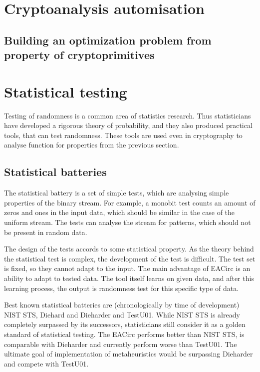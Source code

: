 \documentclass[
  print, %
  Table,   %
  nolof,     %
  nolot,     %
  11pt, %
  oneside  %
]{fithesis3}
\begin{document}
\section{Cryptoanalysis automisation}
\label{sec:cryptoanalysis-automisation}



\subsection[Optimization problem for a cryptoprimitive]{Building an optimization problem from property of cryptoprimitives}
\label{subsec:opti-crypto}


\section{Statistical testing}
\label{sec:stat-testing}

Testing of randomness is a common area of statistics research. Thus statisticians have developed a rigorous theory of probability, and they also produced practical tools, that can test randomness. These tools are used even in cryptography to analyse function for properties from the previous section.

\subsection{Statistical batteries}
\label{subsec:stat-batt}

The statistical battery is a set of simple tests, which are analysing simple properties of the binary stream. For example, a monobit test counts an amount of zeros and ones in the input data, which should be similar in the case of the uniform stream. The tests can analyse the stream for patterns, which should not be present in random data.

The design of the tests accords to some statistical property. As the theory behind the statistical test is complex, the development of the test is difficult. The test set is fixed, so they cannot adapt to the input. The main advantage of EACirc is an ability to adapt to tested data. The tool itself learns on given data, and after this learning process, the output is randomness test for this specific type of data.

Best known statistical batteries are (chronologically by time of development) NIST STS, Diehard and Dieharder and TestU01. While NIST STS is already completely surpassed by its successors, statisticians still consider it as a golden standard of statistical testing. The EACirc performs better than NIST STS, is comparable with Dieharder and currently perform worse than TestU01. The ultimate goal of implementation of metaheuristics would be surpassing Dieharder and compete with TestU01.
\end{document}
